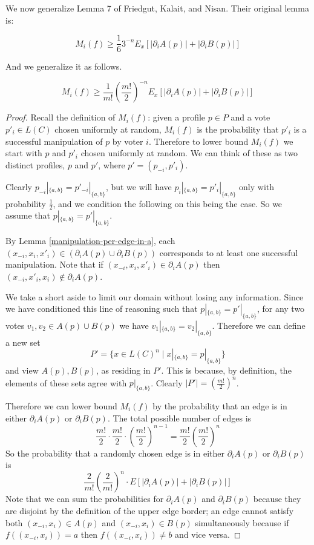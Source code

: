 	We now generalize Lemma 7 of Friedgut, Kalait, and Nisan. Their original lemma is:

	\begin{lemma}
		\[
			M_i(f) \ge \frac{1}{6} 3^{-n} E_x \left[|\partial_i A(p)| + |\partial_i B(p)| \right]
		\]
	\end{lemma}

	And we generalize it as follows.

	\begin{lemma}
		\label{friedgut-lemma-7}
		\[
			M_i(f) \ge \frac{1}{m!} \left(\frac{m!}{2}\right)^{-n} E_x \left[|\partial_i A(p)| + |\partial_i B(p)| \right]
		\]
	\end{lemma}

	\begin{proof}
		Recall the definition of $M_i(f)$: given a profile $p \in P$ and a vote $p'_i \in L(C)$ chosen uniformly at random, $M_i(f)$ is the probability that $p'_i$ is a successful manipulation of $p$ by voter $i$. Therefore to lower bound $M_i(f)$ we start with $p$ and $p'_i$ chosen uniformly at random. We can think of these as two distinct profiles, $p$ and $p'$, where $p' = (p_{-i}, p'_i)$.

		Clearly $p_{-i}|_{\{a,b\}} = p'_{-i}|_{\{a,b\}}$, but we will have $p_i|_{\{a,b\}} = p'_i|_{\{a,b\}}$ only with probability $\frac{1}{2}$, and we condition the following on this being the case. So we assume that $p|_{\{a,b\}} = p'|_{\{a,b\}}$.

		By Lemma \ref{manipulation-per-edge-in-a}, each $(x_{-i}, x_i, x'_i) \in (\partial_i A(p) \cup \partial_i B(p))$ corresponds to at least one successful manipulation. Note that if $(x_{-i}, x_i, x'_i) \in \partial_i A(p)$ then $(x_{-i}, x'_i, x_i) \notin \partial_i A(p)$.

		We take a short aside to limit our domain without losing any information. Since we have conditioned this line of reasoning such that $p|_{\{a,b\}} = p'|_{\{a,b\}}$, for any two votes $v_1, v_2 \in A(p) \cup B(p)$ we have $v_1|_{\{a,b\}} = v_2|_{\{a,b\}}$. Therefore we can define a new set
		\[
			P' = \{x \in L(C)^n \mid x|_{\{a,b\}} = p|_{\{a,b\}}\}
		\]
		and view $A(p), B(p)$, as residing in $P'$. This is because, by definition, the elements of these sets agree with $p|_{\{a,b\}}$. Clearly $|P'| = (\frac{m!}{2})^n$.

		Therefore we can lower bound $M_i(f)$ by the probability that an edge is in either $\partial_i A(p)$ or $\partial_i B(p)$. The total possible number of edges is
		\[
			\frac{m!}{2} \cdot \frac{m!}{2} \cdot \left(\frac{m!}{2}\right)^{n-1} = \frac{m!}{2}\left(\frac{m!}{2}\right)^{n}
		\]
		So the probability that a randomly chosen edge is in either $\partial_i A(p)$ or $\partial_i B(p)$ is
		\[
			\frac{2}{m!} \left(\frac{2}{m!}\right)^{n} \cdot E \left[ |\partial_i A(p)| + |\partial_i B(p)| \right]
		\]
		Note that we can sum the probabilities for $\partial_i A(p)$ and $\partial_i B(p)$ because they are disjoint by the definition of the upper edge border; an edge cannot satisfy both $(x_{-i}, x_i) \in A(p)$ and $(x_{-i}, x_i) \in B(p)$ simultaneously because if $f((x_{-i}, x_i)) = a$ then $f((x_{-i}, x_i)) \ne b$ and vice versa.


\end{proof}

